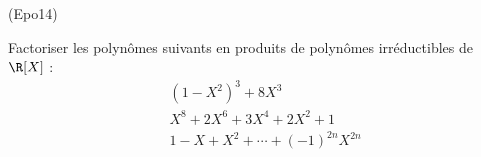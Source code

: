 \begin{tiny}(Epo14)\end{tiny} Factoriser les polyn{\^o}mes suivants en produits de polyn{\^o}mes
irr{\'e}ductibles de $\R[X]$ :
\begin{eqnarray*}
&(1-X^{2})^{3}+8X^{3} \\
&X^{8}+2X^{6}+3X^{4}+2X^{2}+1 \\
& 1-X+X^2+\cdots +(-1)^{2n}X^{2n}
\end{eqnarray*}